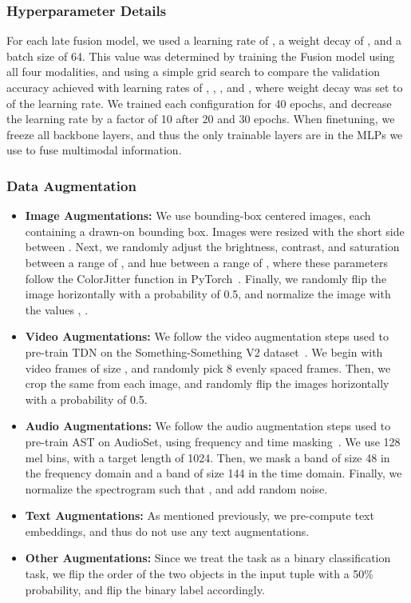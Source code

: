 \documentclass[runningheads]{llncs}
\begin{document}
\subsubsection{Hyperparameter Details} For each late fusion model, we used a learning rate of , a weight decay of , and a batch size of 64. This value was determined by training the Fusion model using all four modalities, and using a simple grid search to compare the validation accuracy achieved with learning rates of , , , and , where weight decay was set to  of the learning rate. We trained each configuration for 40 epochs, and decrease the learning rate by a factor of 10 after 20 and 30 epochs. When finetuning, we freeze all backbone layers, and thus the only trainable layers are in the MLPs we use to fuse multimodal information. 

\subsubsection{Data Augmentation}
\begin{itemize}
    \item \textbf{Image Augmentations:} We use bounding-box centered images, each containing a drawn-on bounding box. Images were resized with the short side between . Next, we randomly adjust the brightness, contrast, and saturation between a range of , and hue between a range of , where these parameters follow the ColorJitter function in PyTorch~\cite{pytorch2019}. Finally, we randomly flip the image horizontally with a probability of 0.5, and normalize the image with the values , .
    \item \textbf{Video Augmentations:} We follow the video augmentation steps used to pre-train TDN on the Something-Something V2 dataset~\cite{wang2021tdn}. We begin with video frames of size , and randomly pick 8 evenly spaced frames. Then, we crop the same  from each image, and randomly flip the images horizontally with a probability of 0.5. 
    \item \textbf{Audio Augmentations:} We follow the audio augmentation steps used to pre-train AST on AudioSet, using frequency and time masking~\cite{gong2021ast}. We use 128 mel bins, with a target length of 1024. Then, we mask a band of size 48 in the frequency domain and a band of size 144 in the time domain. Finally, we normalize the spectrogram such that , and add random noise.
    \item \textbf{Text Augmentations:} As mentioned previously, we pre-compute text embeddings, and thus do not use any text augmentations.
    \item \textbf{Other Augmentations:} Since we treat the task as a binary classification task, we flip the order of the two objects in the input tuple with a 50\% probability, and flip the binary label accordingly. 
\end{itemize}
\end{document}

